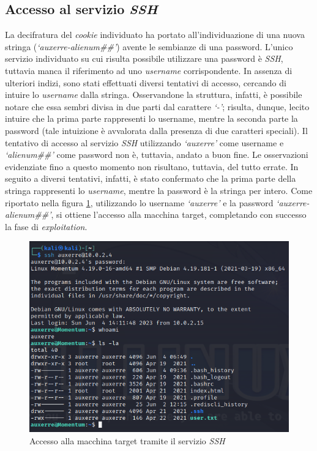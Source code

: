 \subsection{Accesso al servizio \emph{SSH}}
La decifratura del \emph{cookie} individuato ha portato all'individuazione di una nuova stringa (\emph{`auxerre-alienum\#\#'}) avente le sembianze di una password. L'unico servizio individuato su cui risulta possibile utilizzare una password è \emph{SSH}, tuttavia manca il riferimento ad uno \emph{username} corrispondente. In assenza di ulteriori indizi, sono stati effettuati diversi tentativi di accesso, cercando di intuire lo \emph{username} dalla stringa. Osservandone la struttura, infatti, è possibile notare che essa sembri divisa in due parti dal carattere \emph{`-'}; risulta, dunque, lecito intuire che la prima parte rappresenti lo username, mentre la seconda parte la password (tale intuizione è avvalorata dalla presenza di due caratteri speciali). Il tentativo di accesso al servizio \emph{SSH} utilizzando \emph{`auxerre'} come username e \emph{`alienum\#\#'} come password non è, tuttavia, andato a buon fine. Le osservazioni evidenziate fino a questo momento non risultano, tuttavia, del tutto errate. In seguito a diversi tentativi, infatti, è stato confermato che la prima parte della stringa rappresenti lo \emph{username}, mentre la password è la stringa per intero. Come riportato nella figura \ref{fig:ssh_success}, utilizzando lo username \emph{`auxerre'} e la password \emph{`auxerre-alienum\#\#'}, si ottiene l'accesso alla macchina target, completando con successo la fase di \emph{exploitation}. 
\begin{figure}[h]
    \centering
    \includegraphics[scale=0.7]{capitoli/images/ssh_success.png}
    \caption{Accesso alla macchina target tramite il servizio \emph{SSH}}
    \label{fig:ssh_success}
\end{figure}
